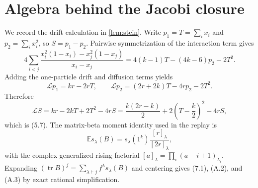 \documentclass[11pt]{article}
\newcommand{\E}{\mathbb E}
\newcommand{\tr}{\operatorname{tr}}
\newcommand{\cL}{\mathcal L}
\begin{document}
\section{Algebra behind the Jacobi closure}

We record the drift calculation in \cref{lem:stein}.  Write
$p_1=T=\sum_i x_i$ and $p_2=\sum_i x_i^2$, so $S=p_1-p_2$.  Pairwise
symmetrization of the interaction term gives
\[
 4\sum_{i<j}\frac{x_i^2(1-x_i)-x_j^2(1-x_j)}{x_i-x_j}
 =4(k-1)T-(4k-6)p_2-2T^2.                                  \tag{B.1}
\]
Adding the one-particle drift and diffusion terms yields
\[
 \cL p_1=kr-2rT,
 \qquad
 \cL p_2=(2r+2k)T-4rp_2-2T^2.                              \tag{B.2}
\]
Therefore
\[
 \cL S=kr-2kT+2T^2-4rS
 =\frac{k(2r-k)}2+2\left(T-\frac k2\right)^2-4rS,           \tag{B.3}
\]
which is (5.7).  The matrix-beta moment identity used in the replay is
\[
 \E s_\lambda(B)=s_\lambda(1^k)
 \frac{[r]_\lambda}{[2r]_\lambda},                         \tag{B.4}
\]
with the complex generalized rising factorial
$[a]_\lambda=\prod_i(a-i+1)_{\lambda_i}$.  Expanding
$(\tr B)^j=\sum_{\lambda\vdash j}f^\lambda s_\lambda(B)$ and centering gives
(7.1), (A.2), and (A.3) by exact rational simplification.

\printbibliography
\end{document}
